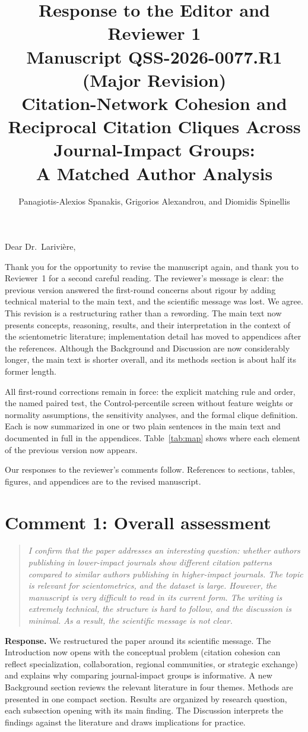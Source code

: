 \documentclass[11pt]{article}
\title{Response to the Editor and Reviewer 1\\
\large Manuscript QSS-2026-0077.R1 (Major Revision)\\
Citation-Network Cohesion and Reciprocal Citation Cliques Across Journal-Impact Groups:\\
A Matched Author Analysis}
\author{Panagiotis-Alexios Spanakis, Grigorios Alexandrou, and Diomidis Spinellis}
\date{}
\newcommand{\commenttext}[1]{\begin{quote}\itshape #1\end{quote}}
\newcommand{\response}{\textbf{Response.} }
\begin{document}
\maketitle

Dear Dr.~Larivi\`ere,

Thank you for the opportunity to revise the manuscript again, and thank you to Reviewer~1 for a second careful reading.  The reviewer's message is clear: the previous version answered the first-round concerns about rigour by adding technical material to the main text, and the scientific message was lost.  We agree.  This revision is a restructuring rather than a rewording.  The main text now presents concepts, reasoning, results, and their interpretation in the context of the scientometric literature; implementation detail has moved to appendices after the references.  Although the Background and Discussion are now considerably longer, the main text is shorter overall, and its methods section is about half its former length.

All first-round corrections remain in force: the explicit matching rule and order, the named paired test, the Control-percentile screen without feature weights or normality assumptions, the sensitivity analyses, and the formal clique definition.  Each is now summarized in one or two plain sentences in the main text and documented in full in the appendices.  Table~\ref{tab:map} shows where each element of the previous version now appears.

Our responses to the reviewer's comments follow.  References to sections, tables, figures, and appendices are to the revised manuscript.

\section*{Comment 1: Overall assessment}

\commenttext{I confirm that the paper addresses an interesting question: whether authors publishing in lower-impact journals show different citation patterns compared to similar authors publishing in higher-impact journals. The topic is relevant for scientometrics, and the dataset is large. However, the manuscript is very difficult to read in its current form. The writing is extremely technical, the structure is hard to follow, and the discussion is minimal. As a result, the scientific message is not clear.}

\response We restructured the paper around its scientific message.  The Introduction now opens with the conceptual problem (citation cohesion can reflect specialization, collaboration, regional communities, or strategic exchange) and explains why comparing journal-impact groups is informative.  A new Background section reviews the relevant literature in four themes.  Methods are presented in one compact section.  Results are organized by research question, each subsection opening with its main finding.  The Discussion interprets the findings against the literature and draws implications for practice.
\end{document}
